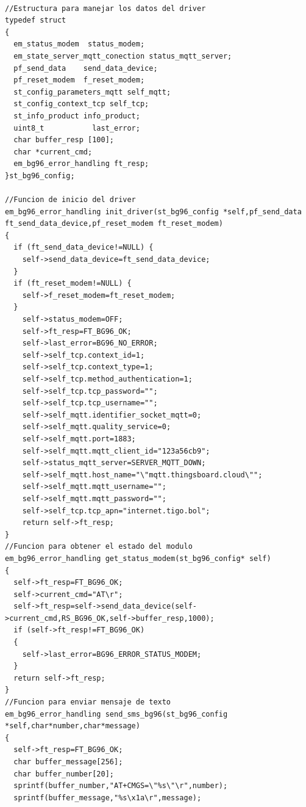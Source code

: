\begin{lstlisting}[label=cod:driver bg96,caption=Funciones principales del driver del sensor AHT10.]  % Start your code-block

//Estructura para manejar los datos del driver 
typedef struct 
{
  em_status_modem  status_modem;
  em_state_server_mqtt_conection status_mqtt_server;
  pf_send_data    send_data_device;
  pf_reset_modem  f_reset_modem; 
  st_config_parameters_mqtt self_mqtt;
  st_config_context_tcp self_tcp;
  st_info_product info_product;
  uint8_t           last_error;
  char buffer_resp [100];
  char *current_cmd;
  em_bg96_error_handling ft_resp;
}st_bg96_config;

//Funcion de inicio del driver 
em_bg96_error_handling init_driver(st_bg96_config *self,pf_send_data ft_send_data_device,pf_reset_modem ft_reset_modem)
{
  if (ft_send_data_device!=NULL) {
    self->send_data_device=ft_send_data_device;
  }
  if (ft_reset_modem!=NULL) {
    self->f_reset_modem=ft_reset_modem;
  }
    self->status_modem=OFF;
    self->ft_resp=FT_BG96_OK;
    self->last_error=BG96_NO_ERROR;
    self->self_tcp.context_id=1;
    self->self_tcp.context_type=1;
    self->self_tcp.method_authentication=1;
    self->self_tcp.tcp_password="";
    self->self_tcp.tcp_username="";
    self->self_mqtt.identifier_socket_mqtt=0;
    self->self_mqtt.quality_service=0;
    self->self_mqtt.port=1883;
    self->self_mqtt.mqtt_client_id="123a56cb9";
    self->status_mqtt_server=SERVER_MQTT_DOWN;
    self->self_mqtt.host_name="\"mqtt.thingsboard.cloud\"";
    self->self_mqtt.mqtt_username="";
    self->self_mqtt.mqtt_password="";
    self->self_tcp.tcp_apn="internet.tigo.bol";
    return self->ft_resp;
}
//Funcion para obtener el estado del modulo
em_bg96_error_handling get_status_modem(st_bg96_config* self)
{
  self->ft_resp=FT_BG96_OK;
  self->current_cmd="AT\r";
  self->ft_resp=self->send_data_device(self->current_cmd,RS_BG96_OK,self->buffer_resp,1000);
  if (self->ft_resp!=FT_BG96_OK)
  {
    self->last_error=BG96_ERROR_STATUS_MODEM;
  }
  return self->ft_resp;
}
//Funcion para enviar mensaje de texto 
em_bg96_error_handling send_sms_bg96(st_bg96_config *self,char*number,char*message)
{
  self->ft_resp=FT_BG96_OK;
  char buffer_message[256];
  char buffer_number[20];
  sprintf(buffer_number,"AT+CMGS=\"%s\"\r",number);
  sprintf(buffer_message,"%s\x1a\r",message);
  

\end{lstlisting}
